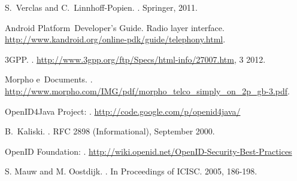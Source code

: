 \documentclass[runningheads,a4paper]{llncs}
\begin{document}
\begin{thebibliography}{10}
S.~Verclas and C.~Linnhoff-Popien.
.
\newblock Springer, 2011.


Android Platform~Developer's Guide.
\newblock Radio layer interface.
\newblock \url{http://www.kandroid.org/online-pdk/guide/telephony.html}.

3GPP.
.
\newblock \url{http://www.3gpp.org/ftp/Specs/html-info/27007.htm}, 3 2012.


Morpho e~Documents.
.
\newblock \url{http://www.morpho.com/IMG/pdf/morpho_telco_simply_on_2p_gb-3.pdf}.


{OpenID4Java Project}:
.
\newblock \url{http://code.google.com/p/openid4java/}

B.~Kaliski.
.
\newblock RFC 2898 (Informational), September 2000.


{OpenID Foundation}:
.
\newblock \url{http://wiki.openid.net/OpenID-Security-Best-Practices}


S. Mauw and M. Oostdijk.
.
\newblock In Proceedings of ICISC. 2005, 186-198.
%



%
%
%



\end{thebibliography}
%
\end{document}
